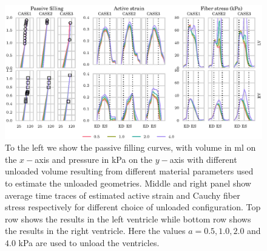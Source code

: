 \begin{figure}[htbp]
  \centering
  \includegraphics[width=\textwidth]{figures/startsens_results}
  \caption{\label{paper3:fig:startsens}To the left we show the passive
    filling curves, with volume in ml on the $x-$axis and pressure in
    kPa on the $y-$axis with different unloaded volume resulting from
    different material parameters used to estimate the unloaded
    geometries. Middle and right panel show average time traces of
    estimated active strain and Cauchy fiber stress respectively for
    different choice of unloaded configuration. Top row shows the
    results in the left ventricle while bottom row shows the results
    in the right ventricle. Here the values $a = 0.5, 1.0, 2.0$ and
    $4.0$ kPa are used to unload the ventricles. }
\end{figure}



\newpage




